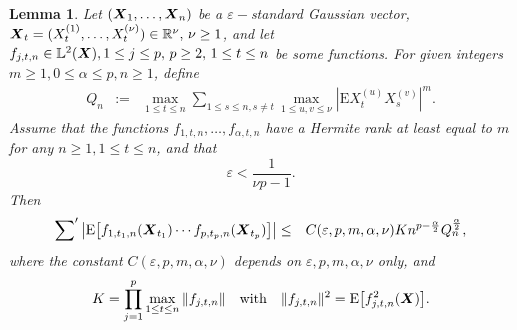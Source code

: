 \documentclass[10pt]{article}
\def\L{\mathbb{L}}
\def\R{\mathbb{R}}
\def\E{\mathrm E}
\newcommand{\mbf}[1]{\mbox{\boldmath $#1$}}
\newtheorem{lem}{Lemma}
\begin{document}
\begin{lem}\label{lemgauss}
Let $({\mbf X}_1, \dots, {\mbf X}_n)$ be a $\varepsilon-$standard
Gaussian vector, ${\mbf X}_t = (X^{(1)}_{t}, \dots,X^{(\nu)}_{t})
\in {\R}^\nu, \, \nu \ge 1$, and let $f_{j,t,n} \in \L^2({\mbf X}),
1\le j \le p, \,  p\ge 2, \, 1\le t \le n $ be some functions. For
given integers $m\ge 1, 0\le \alpha \le p, n \ge 1$, define
\begin{eqnarray}
Q_n &:=&\max_{1\le t \le n} \sum_{1\le s\le n, s\neq t} \max_{1\le
u,v \le \nu} |\E X^{(u)}_{t} X^{(v)}_{s}|^m. \label{Q_N}
\end{eqnarray}
Assume that the functions $f_{1,t,n},\dots, f_{\alpha,t,n} $ have
a Hermite rank at least equal to $m$ for any $n\ge 1, 1\le t \le
n$, and that
\begin{equation}
\varepsilon < \frac{1}{\nu p-1}. \label{eps}
\end{equation}
Then
\begin{eqnarray}\label{momgauss}
\sum\nolimits^\prime \big|\E \big[f_{1,t_1,n}({\mbf X}_{t_1}) \cdots
f_{p,t_p,n}({\mbf X}_{t_p})\big] \big|
&\le& C( \varepsilon, p, m, \alpha,
\nu ) K n^{p- \frac{\alpha}{2}} Q_n^{\frac{\alpha}{2} },
\end{eqnarray}
where the constant $C( \varepsilon, p, m, \alpha, \nu ) $ depends
on $\varepsilon, p, m, \alpha, \nu $ only, and
\begin{equation}
K = \prod_{j=1}^p \max_{1\le t \le n}  \|f_{j,t,n}\|\quad \mbox{with}\quad \|f_{j,t,n}\|^2 = \E \big[f_{j,t,n}^2({\mbf X})\big].
\label{K_prod}
\end{equation}
\end{lem}
\end{document}
